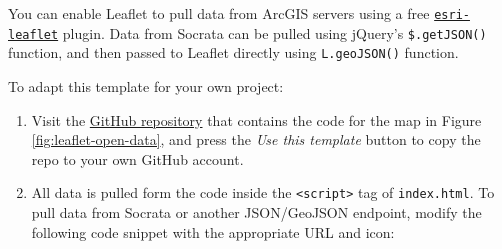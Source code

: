 \documentclass[
  english,
]{book}
\providecommand{\tightlist}{%
  \setlength{\itemsep}{0pt}\setlength{\parskip}{0pt}}
\begin{document}
You can enable Leaflet to pull data from ArcGIS servers using a free \href{https://github.com/Esri/esri-leaflet}{\texttt{esri-leaflet}} plugin.
Data from Socrata can be pulled using jQuery's \texttt{\$.getJSON()} function,
and then passed to Leaflet directly using \texttt{L.geoJSON()} function.

To adapt this template for your own project:

\begin{enumerate}
\def\labelenumi{\arabic{enumi}.}
\tightlist
\item
  Visit the \href{https://github.com/HandsOnDataViz/leaflet-maps-open-data-apis}{GitHub repository} that contains the code for the map in Figure \ref{fig:leaflet-open-data},
  and press the \emph{Use this template} button to copy the repo to your own GitHub account.
\item
  All data is pulled form the code inside the \texttt{\textless{}script\textgreater{}} tag of \texttt{index.html}. To pull
  data from Socrata or another JSON/GeoJSON endpoint, modify the following code snippet
  with the appropriate URL and icon:
\end{enumerate}
\end{document}
